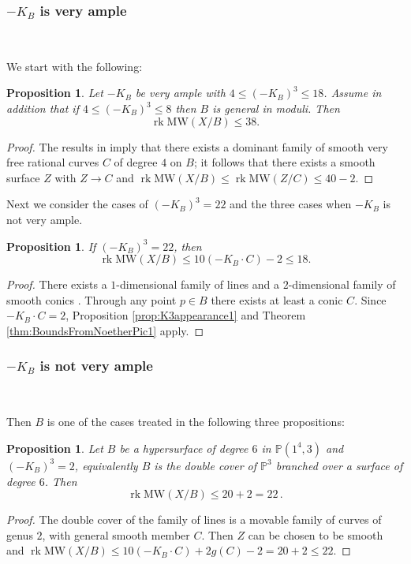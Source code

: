 \documentclass[11pt]{amsart}
\newtheorem{proposition}[theorem]{Proposition}
\theoremstyle{definition}
\theoremstyle{definition}
\theoremstyle{remark}
\theoremstyle{remark}
\theoremstyle{definition}
\theoremstyle{conjecture}
\newcommand{\MW}{\mathrm{MW}}
\begin{document}
\medskip

\subsubsection{$-K_B$ is very ample}~
\vskip 0.1in

We start with the following: 
\begin{proposition} Let $-K_B$ be very ample with  $ 4 \leq (-K_B)^3 \leq 18$. Assume in  addition that if $ 4 \leq (-K_B)^3 \leq 8$  then $B$ is {general} in moduli. Then 
\[\operatorname{rk} \MW(X/B)  \leq 38.\]
    
\end{proposition}

\begin{proof}
The results in \cite[Theorem 1 and Lemma 8.1]{Lehmann2018RationalCO, Lehmann2025CorrigendaT}  imply that there exists a dominant family of 
smooth very free rational curves $C$  of degree $4$ on $B$; it follows that there exists a smooth surface $Z$ with $Z \to C$ and $\operatorname{rk} \MW(X/B)  \leq \operatorname{rk} \MW(Z/C) \leq 40 -2$.
\end{proof}

Next we consider the cases of  $(-K_B)^3=22$ and  the three cases when $-K_B$ is not  very ample.

\begin{proposition} If $(-K_B)^3=22$, then
\[\operatorname{rk} \MW(X/B)  \leq  10(-K_B \cdot C ) -2 \leq 18.\]
\end{proposition}
\begin{proof}There exists a $1$-dimensional family of lines 
and a $2$-dimensional family of  smooth conics  \cite[Lemma 3.2]{ArrondoFaenzi2006}. Through any point $p \in B$ there exists at least a conic  $C$. Since $-K_B \cdot C=2$, Proposition \ref{prop:K3appearance1} and Theorem \ref{thm:BoundsFromNoetherPic1} apply.
\end{proof}

\vskip 0.3in
\subsubsection{$-K_B$ is  not very ample}~
\vskip 0.1in

 Then $B$ is one of the   cases treated in the following three propositions:


 
\begin{proposition} Let $B$ be a hypersurface of degree $6$ in $\mathbb{P}(1^4,3)$ and $(-K_B)^3=2$, equivalently $B$ is the double cover of $\mathbb{P}^3$ branched over a surface of degree $6$.  Then 
   \[\operatorname{rk} \MW(X/B)  \leq 20+2 = 22 \,.\] 
\end{proposition}
\begin{proof} The double cover of the family of lines is a movable family of curves of genus $2$, with general smooth member $C$. Then $Z$ can be chosen to be smooth  and  $\operatorname{rk} \MW(X/B)  \leq  10(-K_B \cdot C ) +2g(C) -2 =20+2 \leq 22.$ \end{proof}
\end{document}
